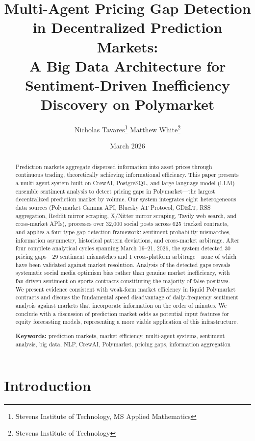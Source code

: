 \documentclass[12pt, letterpaper]{article}
\title{%
  \textbf{Multi-Agent Pricing Gap Detection in Decentralized Prediction Markets:}\\[6pt]
  \large A Big Data Architecture for Sentiment-Driven Inefficiency Discovery on Polymarket
}
\author{
  Nicholas Tavares\thanks{Stevens Institute of Technology, MS Applied Mathematics} \quad
  Matthew White\thanks{Stevens Institute of Technology}
}
\date{March 2026}
\begin{document}
\maketitle

\begin{abstract}
Prediction markets aggregate dispersed information into asset prices through continuous trading, theoretically achieving informational efficiency. This paper presents a multi-agent system built on CrewAI, PostgreSQL, and large language model (LLM) ensemble sentiment analysis to detect pricing gaps in Polymarket---the largest decentralized prediction market by volume. Our system integrates eight heterogeneous data sources (Polymarket Gamma API, Bluesky AT Protocol, GDELT, RSS aggregation, Reddit mirror scraping, X/Nitter mirror scraping, Tavily web search, and cross-market APIs), processes over 32,000 social posts across 625 tracked contracts, and applies a four-type gap detection framework: sentiment-probability mismatches, information asymmetry, historical pattern deviations, and cross-market arbitrage. After four complete analytical cycles spanning March 19--21, 2026, the system detected 30 pricing gaps---29 sentiment mismatches and 1 cross-platform arbitrage---none of which have been validated against market resolution. Analysis of the detected gaps reveals systematic social media optimism bias rather than genuine market inefficiency, with fan-driven sentiment on sports contracts constituting the majority of false positives. We present evidence consistent with weak-form market efficiency in liquid Polymarket contracts and discuss the fundamental speed disadvantage of daily-frequency sentiment analysis against markets that incorporate information on the order of minutes. We conclude with a discussion of prediction market odds as potential input features for equity forecasting models, representing a more viable application of this infrastructure.

\medskip
\noindent\textbf{Keywords:} prediction markets, market efficiency, multi-agent systems, sentiment analysis, big data, NLP, CrewAI, Polymarket, pricing gaps, information aggregation
\end{abstract}

\newpage
\tableofcontents
\newpage

\section{Introduction}
\end{document}
